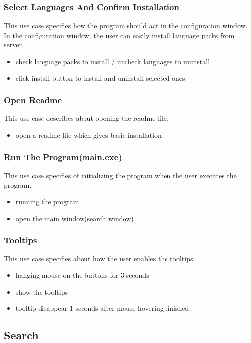 \documentclass[conference]{IEEEtran}
\begin{document}
\subsubsection{Select Languages And Confirm Installation}
This use case specifies how the program should act in the configuration window. In the configuration window, the user can easily install language packs from server.
\begin{itemize}
  \item check language packs to install / uncheck languages to uninstall
  \item click install button to install and uninstall selected ones
\end{itemize}
\textit{}



\subsubsection{Open Readme}
This use case describes about opening the readme file.
\begin{itemize}
  \item open a readme file which gives basic installation
\end{itemize}
\textit{}

\subsubsection{Run The Program(main.exe)}
This use case specifies of initializing the program when the user executes the program.
\begin{itemize}
  \item running the program
  \item open the main window(search window)
\end{itemize}
\textit{}


\subsubsection{Tooltips}
This use case specifies about how the user enables the tooltips
\begin{itemize}
  \item hanging mouse on the buttons for 3 seconds
  \item show the tooltips
  \item tooltip disappear 1 seconds after mouse hovering finished
\end{itemize}
\textit{}

\subsection{Search}
\end{document}
